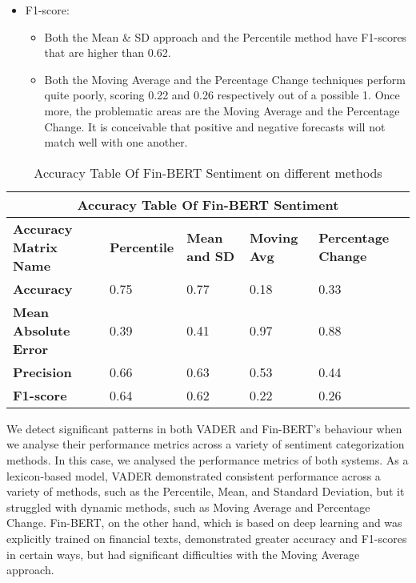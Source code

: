 \documentclass[12pt, a4paper,twoside]{report}
\theoremstyle{plain} %
\theoremstyle{definition} %
\theoremstyle{remark} %
\numberwithin{equation}{chapter}
\begin{document}
\begin{itemize}
\begin{itemize}
            \end{itemize}
        \item F1-score:
            \begin{itemize}
            \item Both the Mean \& SD approach and the Percentile method have F1-scores that are higher than 0.62.
            \item Both the Moving Average and the Percentage Change techniques perform quite poorly, scoring 0.22 and 0.26 respectively out of a possible 1. Once more, the problematic areas are the Moving Average and the Percentage Change.  It is conceivable that positive and negative forecasts will not match well with one another.
            \end{itemize}
    \end{itemize}
    \begin{table}[]
        \centering
        \begin{tabular}{ |p{3cm}||p{3cm}|p{3cm}|p{3cm}|p{3cm}| }
         \hline
         \multicolumn{5}{|c|}{Accuracy Table Of Fin-BERT Sentiment} \\
         \hline
         \textbf{Accuracy Matrix Name} & \textbf{Percentile} & \textbf{Mean and SD} & \textbf{Moving Avg} & \textbf{Percentage Change}\\
         \hline\hline
         \textbf{Accuracy}  & 0.75 & 0.77 & 0.18 & 0.33\\
         \hline
         \textbf{Mean Absolute Error} & 0.39& 0.41& 0.97& 0.88 \\
         \hline
         \textbf{Precision} &0.66& 0.63&0.53&0.44 \\
         \hline
         \textbf{F1-score} &0.64 & 0.62& 0.22& 0.26\\
         \hline
    \end{tabular}
        \caption{Accuracy Table Of Fin-BERT Sentiment on different methods }
        \label{tab:my_label}
    \end{table}
     

    We detect significant patterns in both VADER and Fin-BERT's behaviour when we analyse their performance metrics across a variety of sentiment categorization methods. In this case, we analysed the performance metrics of both systems. As a lexicon-based model, VADER demonstrated consistent performance across a variety of methods, such as the Percentile, Mean, and Standard Deviation, but it struggled with dynamic methods, such as Moving Average and Percentage Change. Fin-BERT, on the other hand, which is based on deep learning and was explicitly trained on financial texts, demonstrated greater accuracy and F1-scores in certain ways, but had significant difficulties with the Moving Average approach.
\end{document}
